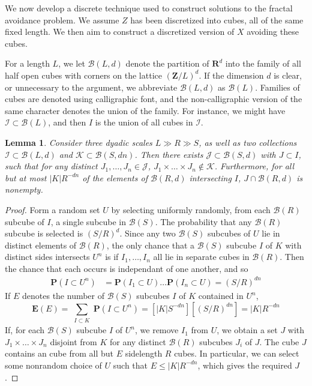\documentclass{article}
\theoremstyle{plain}
\newtheorem{lemma}{Lemma}
\theoremstyle{plain}
\begin{document}
\begin{multicols}{2}
We now develop a discrete technique used to construct solutions to the fractal avoidance problem. We assume $Z$ has been discretized into cubes, all of the same fixed length. We then aim to construct a discretized version of $X$ avoiding these cubes.

For a length $L$, we let $\mathcal{B}(L,d)$ denote the partition of $\mathbf{R}^d$ into the family of all half open cubes with corners on the lattice $(\mathbf{Z}/L)^d$. If the dimension $d$ is clear, or unnecessary to the argument, we abbreviate $\mathcal{B}(L,d)$ as $\mathcal{B}(L)$. Families of cubes are denoted using calligraphic font, and the non-calligraphic version of the same character denotes the union of the family. For instance, we might have $\mathcal{I} \subset \mathcal{B}(L)$, and then $I$ is the union of all cubes in $\mathcal{I}$.

\begin{lemma}
	Consider three dyadic scales $L \gg R \gg S$, as well as two collections $\mathcal{I} \subset \mathcal{B}(L,d)$ and $\mathcal{K} \subset \mathcal{B}(S,dn)$. Then there exists $\mathcal{J} \subset \mathcal{B}(S,d)$ with $J \subset I$, such that for any distinct $J_1, \dots, J_n \in \mathcal{J}$, $J_1 \times \dots \times J_n \not \in \mathcal{K}$. Furthermore, for all but at most $|K|R^{-dn}$ of the elements of $\mathcal{B}(R,d)$ intersecting $I$, $J \cap \mathcal{B}(R,d)$ is nonempty.
\end{lemma}
\begin{proof}
	Form a random set $U$ by selecting uniformly randomly, from each $\mathcal{B}(R)$ subcube of $I$, a single subcube in $\mathcal{B}(S)$. The probability that any $\mathcal{B}(R)$ subcube is selected is $(S/R)^d$. Since any two $\mathcal{B}(S)$ subcubes of $U$ lie in distinct elements of $\mathcal{B}(R)$, the only chance that a $\mathcal{B}(S)$ subcube $I$ of $K$ with distinct sides intersects $U^n$ is if $I_1, \dots, I_n$ all lie in separate cubes in $\mathcal{B}(R)$. Then the chance that each occurs is independant of one another, and so
	\begin{align*}
		\mathbf{P}(I \subset U^n) &= \mathbf{P}(I_1 \subset U) \dots \mathbf{P}(I_n \subset U) = (S/R)^{dn}
	\end{align*}
	If $E$ denotes the number of $\mathcal{B}(S)$ subcubes $I$ of $K$ contained in $U^n$,
	\[ \mathbf{E}(E) = \sum_{\substack{I \subset K}} \mathbf{P}(I \subset U^n) = [|K| S^{-dn}] [(S/R)^{dn}] = |K| R^{-dn} \]
	If, for each $\mathcal{B}(S)$ subcube $I$ of $U^n$, we remove $I_1$ from $U$, we obtain a set $J$ with $J_1 \times \dots \times J_n$ disjoint from $K$ for any distinct $\mathcal{B}(R)$ subcubes $J_i$ of $J$. The cube $J$ contains an cube from all but $E$ sidelength $R$ cubes. In particular, we can select some nonrandom choice of $U$ such that $E \leq |K| R^{-dn}$, which gives the required $J$.
\end{proof}


\end{multicols}
\end{document}
